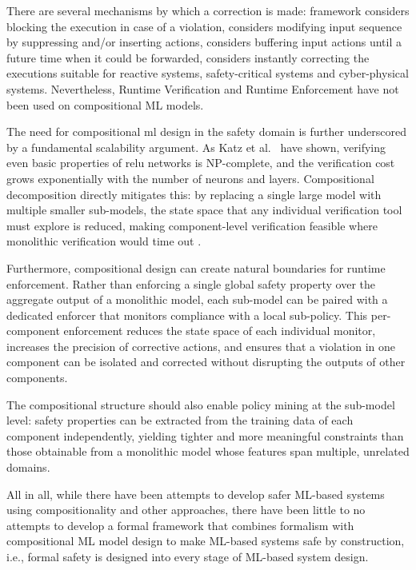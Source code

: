 There are several mechanisms by which a correction is made: framework \cite{10.1145/353323.353382} considers blocking the execution in case of a violation,  \cite{10.1007/s10207-004-0046-8} considers modifying input sequence by suppressing and/or inserting actions, \cite{10.1007/s10703-014-0215-y} considers buffering input actions until a future time when it could be forwarded, \cite{10.1145/3092282.3092291,pearce_smart_2020} considers instantly correcting the executions suitable for reactive systems, safety-critical systems and cyber-physical systems. Nevertheless, Runtime Verification and Runtime Enforcement have not been used on compositional ML models.


The need for compositional \gls{ml} design in the safety domain is further underscored by a fundamental scalability argument. As Katz et al.\ \cite{katz_reluplex_2017} have shown, verifying even basic properties of \gls{relu} networks is NP-complete, and the verification cost grows exponentially with the number of neurons and layers. Compositional decomposition directly mitigates this: by replacing a single large model with multiple smaller sub-models, the state space that any individual verification tool must explore is reduced, making component-level verification feasible where monolithic verification would time out \cite{pasareanu_compositional_2018, Kouvaros2021Towards}. 

Furthermore, compositional design can create natural boundaries for runtime enforcement. Rather than enforcing a single global safety property over the aggregate output of a monolithic model, each sub-model can be paired with a dedicated enforcer \cite{10.1145/3092282.3092291, pearce_smart_2020} that monitors compliance with a local sub-policy. This per-component enforcement reduces the state space of each individual monitor, increases the precision of corrective actions, and ensures that a violation in one component can be isolated and corrected without disrupting the outputs of other components. 

The compositional structure should also enable policy mining at the sub-model level: safety properties can be extracted from the training data of each component independently, yielding tighter and more meaningful constraints than those obtainable from a monolithic model whose features span multiple, unrelated domains.

All in all, while there have been attempts to develop safer ML-based systems using compositionality and other approaches, there have been little to no attempts to develop a formal framework that combines formalism with compositional ML model design to make ML-based systems safe by construction, i.e., formal safety is designed into every stage of ML-based system design. 


